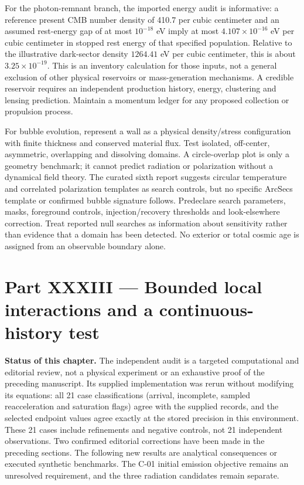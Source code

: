 \documentclass[
  11pt,
  twoside]{article}
\begin{document}
For the photon-remnant branch, the imported energy audit is informative:
a reference present CMB number density of 410.7 per cubic centimeter and
an assumed rest-energy gap of at most \(10^{-18}\) eV imply at most
\(4.107\times10^{-16}\) eV per cubic centimeter in stopped rest energy
of that specified population. Relative to the illustrative dark-sector
density \(1264.41\) eV per cubic centimeter, this is about
\(3.25\times10^{-19}\). This is an inventory calculation for those
inputs, not a general exclusion of other physical reservoirs or
mass-generation mechanisms. A credible reservoir requires an independent
production history, energy, clustering and lensing prediction. Maintain
a momentum ledger for any proposed collection or propulsion process.

For bubble evolution, represent a wall as a physical density/stress
configuration with finite thickness and conserved material flux. Test
isolated, off-center, asymmetric, overlapping and dissolving domains. A
circle-overlap plot is only a geometry benchmark; it cannot predict
radiation or polarization without a dynamical field theory. The curated
sixth report suggests circular temperature and correlated polarization
templates as search controls, but no specific ArcSecs template or
confirmed bubble signature follows. Predeclare search parameters, masks,
foreground controls, injection/recovery thresholds and look-elsewhere
correction. Treat reported null searches as information about
sensitivity rather than evidence that a domain has been detected. No
exterior or total cosmic age is assigned from an observable boundary
alone.

\section{Part XXXIII --- Bounded local interactions and a
continuous-history
test}\label{part-xxxiii-bounded-local-interactions-and-a-continuous-history-test}

\textbf{Status of this chapter.} The independent audit is a targeted
computational and editorial review, not a physical experiment or an
exhaustive proof of the preceding manuscript. Its supplied
implementation was rerun without modifying its equations: all 21 case
classifications (arrival, incomplete, sampled reacceleration and
saturation flags) agree with the supplied records, and the selected
endpoint values agree exactly at the stored precision in this
environment. These 21 cases include refinements and negative controls,
not 21 independent observations. Two confirmed editorial corrections
have been made in the preceding sections. The following new results are
analytical consequences or executed synthetic benchmarks. The C-01
initial emission objective remains an unresolved requirement, and the
three radiation candidates remain separate.
\end{document}

